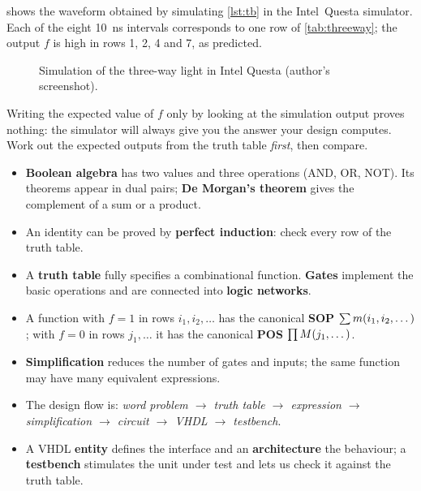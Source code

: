  shows the waveform obtained by simulating \cref{lst:tb} in the Intel\textregistered\ Questa simulator. Each of the eight 10~ns intervals corresponds to one row of \cref{tab:threeway}; the output $f$ is high in rows 1, 2, 4 and 7, as predicted.

\begin{figure}[htbp]
\centering
{}
\caption{Simulation of the three-way light in Intel Questa (author's screenshot).}\label{fig:sim-threeway}
\end{figure}

\begin{caution}
Writing the expected value of $f$ only by looking at the simulation output proves nothing: the simulator will always give you the answer your design computes. Work out the expected outputs from the truth table \emph{first}, then compare.
\end{caution}

\begin{chaptersummary}
\begin{itemize}
  \item \textbf{Boolean algebra} has two values and three operations (AND, OR, NOT). Its theorems appear in dual pairs; \textbf{De Morgan's theorem} gives the complement of a sum or a product.
  \item An identity can be proved by \textbf{perfect induction}: check every row of the truth table.
  \item A \textbf{truth table} fully specifies a combinational function. \textbf{Gates} implement the basic operations and are connected into \textbf{logic networks}.
  \item A function with $f=1$ in rows $i_1,i_2,\dots$ has the canonical \textbf{SOP} $\sum m(i_1,i_2,\dots)$; with $f=0$ in rows $j_1,\dots$ it has the canonical \textbf{POS} $\prod M(j_1,\dots)$.
  \item \textbf{Simplification} reduces the number of gates and inputs; the same function may have many equivalent expressions.
  \item The design flow is: \emph{word problem $\to$ truth table $\to$ expression $\to$ simplification $\to$ circuit $\to$ VHDL $\to$ testbench}.
  \item A VHDL \textbf{entity} defines the interface and an \textbf{architecture} the behaviour; a \textbf{testbench} stimulates the unit under test and lets us check it against the truth table.
\end{itemize}
\end{chaptersummary}

